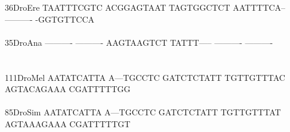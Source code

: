 \documentclass[11pt,twoside,reqno,a4paper]{article}
\begin{document}
{36\hspace*{2\charwidth}DroEre	TAATTTCGTC	ACGGAGTAAT	TAGTGGCTCT	AATTTTCA--	----------	-GGTGTTCCA	\\
\hspace*{4\charwidth}\hspace*{7\charwidth}\hspace*{1\charwidth}\hspace*{1\charwidth}\hspace*{1\charwidth}\hspace*{1\charwidth}\hspace*{1\charwidth}\hspace*{1\charwidth}\\
35\hspace*{2\charwidth}DroAna	----------	----------	AAGTAAGTCT	TATTT-----	----------	----------	\\
\hspace*{4\charwidth}\hspace*{7\charwidth}\hspace*{1\charwidth}\hspace*{1\charwidth}\hspace*{1\charwidth}\hspace*{1\charwidth}\hspace*{1\charwidth}\hspace*{1\charwidth}\\
\\
111\hspace*{1\charwidth}DroMel	AATATCATTA	A---TGCCTC	GATCTCTATT	TGTTGTTTAC	AGTACAGAAA	CGATTTTTGG	\\
\hspace*{4\charwidth}\hspace*{7\charwidth}\hspace*{1\charwidth}\hspace*{1\charwidth}\hspace*{1\charwidth}\hspace*{1\charwidth}\hspace*{1\charwidth}\hspace*{1\charwidth}\\
85\hspace*{2\charwidth}DroSim	AATATCATTA	A---TGCCTC	GATCTCTATT	TGTTGTTTAT	AGTAAAGAAA	CGATTTTTGT	\\
\hspace*{4\charwidth}\hspace*{7\charwidth}\hspace*{1\charwidth}\hspace*{1\charwidth}\hspace*{1\charwidth}\hspace*{1\charwidth}\hspace*{1\charwidth}\hspace*{1\charwidth}\\
}
\end{document}
